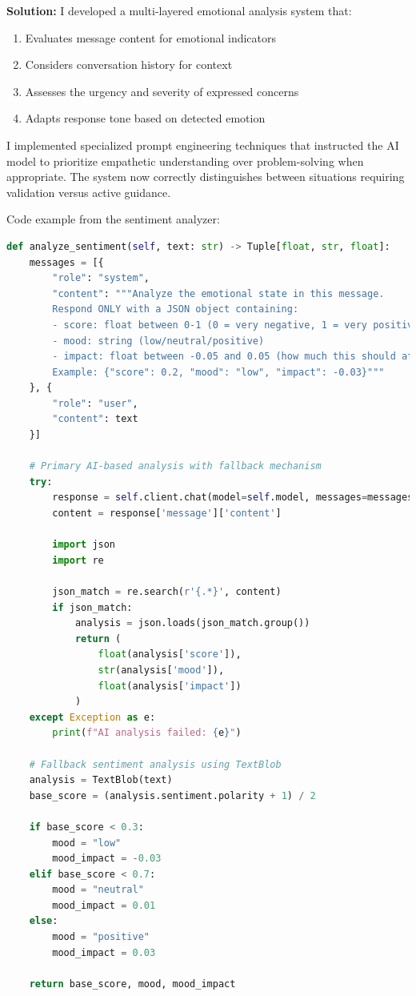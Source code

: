 \documentclass[12pt]{article}
\begin{document}
\textbf{Solution:} I developed a multi-layered emotional analysis system that:

\begin{enumerate}
    \item Evaluates message content for emotional indicators
    \item Considers conversation history for context
    \item Assesses the urgency and severity of expressed concerns
    \item Adapts response tone based on detected emotion
\end{enumerate}

I implemented specialized prompt engineering techniques that instructed the AI model to prioritize empathetic understanding over problem-solving when appropriate. The system now correctly distinguishes between situations requiring validation versus active guidance.

Code example from the sentiment analyzer:

\begin{lstlisting}[language=Python, caption=Enhanced Sentiment Analysis]
def analyze_sentiment(self, text: str) -> Tuple[float, str, float]:
    messages = [{
        "role": "system",
        "content": """Analyze the emotional state in this message. 
        Respond ONLY with a JSON object containing:
        - score: float between 0-1 (0 = very negative, 1 = very positive)
        - mood: string (low/neutral/positive)
        - impact: float between -0.05 and 0.05 (how much this should affect overall mood)
        Example: {"score": 0.2, "mood": "low", "impact": -0.03}"""
    }, {
        "role": "user",
        "content": text
    }]
    
    # Primary AI-based analysis with fallback mechanism
    try:
        response = self.client.chat(model=self.model, messages=messages)
        content = response['message']['content']
        
        import json
        import re
        
        json_match = re.search(r'{.*}', content)
        if json_match:
            analysis = json.loads(json_match.group())
            return (
                float(analysis['score']),
                str(analysis['mood']),
                float(analysis['impact'])
            )
    except Exception as e:
        print(f"AI analysis failed: {e}")
        
    # Fallback sentiment analysis using TextBlob
    analysis = TextBlob(text)
    base_score = (analysis.sentiment.polarity + 1) / 2
    
    if base_score < 0.3:
        mood = "low"
        mood_impact = -0.03
    elif base_score < 0.7:
        mood = "neutral"
        mood_impact = 0.01
    else:
        mood = "positive"
        mood_impact = 0.03
        
    return base_score, mood, mood_impact
\end{lstlisting}
\end{document}
